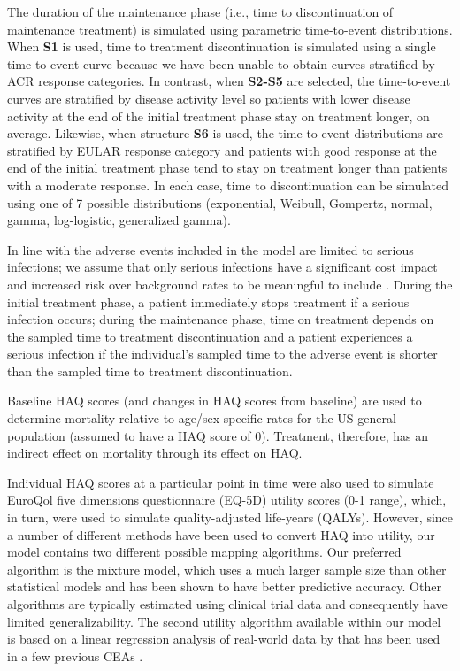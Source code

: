 \documentclass[11pt,final,fleqn]{article}\usepackage[]{graphicx}\usepackage[]{color}
\theoremstyle{plain}
\begin{document}
The duration of the maintenance phase (i.e., time to discontinuation of maintenance treatment) is simulated using parametric time-to-event distributions. When \textbf{S1} is used, time to treatment discontinuation is simulated using a single time-to-event curve because we have been unable to obtain curves stratified by ACR response categories. In contrast, when \textbf{S2-S5} are selected, the time-to-event curves are stratified by disease activity level so patients with lower disease activity at the end of the initial treatment phase stay on treatment longer, on average. Likewise, when structure \textbf{S6} is used, the time-to-event distributions are stratified by EULAR response category and patients with good response at the end of the initial treatment phase tend to stay on treatment longer than patients with a moderate response. In each case, time to discontinuation can be simulated using one of 7 possible distributions (exponential, Weibull, Gompertz, normal, gamma, log-logistic, generalized gamma).

In line with \citet{stevenson2016adalimumab} the adverse events included in the model are limited to serious infections; we assume that only serious infections have a significant cost impact and increased risk over background rates to be meaningful to include \citep{ramiro2017safety}. During the initial treatment phase, a patient immediately stops treatment if a serious infection occurs; during the maintenance phase, time on treatment depends on the sampled time to treatment discontinuation and a patient experiences a serious infection if the individual's sampled time to the adverse event is shorter than the sampled time to treatment discontinuation. 

Baseline HAQ scores (and changes in HAQ scores from baseline) are used to determine mortality relative to age/sex specific rates for the US general population (assumed to have a HAQ score of 0). Treatment, therefore, has an indirect effect on mortality through its effect on HAQ. 

Individual HAQ scores at a particular point in time were also used to simulate EuroQol five dimensions questionnaire (EQ-5D) utility scores (0-1 range), which, in turn, were used to simulate quality-adjusted life-years (QALYs). However, since a number of different methods have been used to convert HAQ into utility, our model contains two different possible mapping algorithms. Our preferred algorithm is the \citet{alava2013relationship} mixture model, which uses a much larger sample size than other statistical models and has been shown to have better predictive accuracy. Other algorithms are typically estimated using clinical trial data \citep[e.g.][]{carlson2015economic, stephens2015modelling} and consequently have limited generalizability. The second utility algorithm available within our model is based on a linear regression analysis of real-world data by \citet{wailoo2006modeling} that has been used in a few previous CEAs \citep[e.g.][]{wailoo2008biologic, icer2017tim}. 
\end{document}
